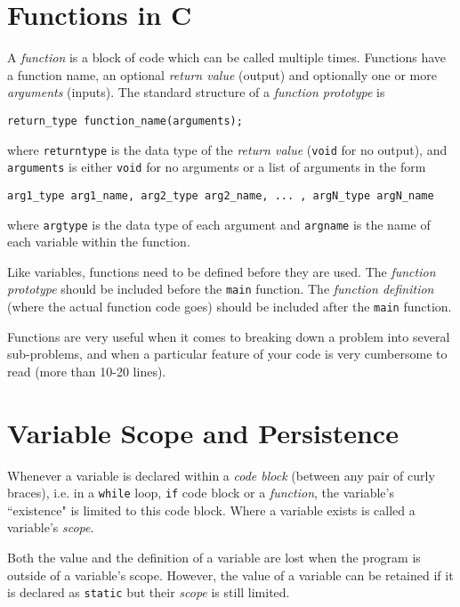 \documentclass{pass}
\begin{document}
\section*{Functions in C}
A \textit{function} is a block of code which can be called multiple times. Functions have a function name, an optional \textit{return value} (output) and optionally one or more \textit{arguments} (inputs). The standard structure of a \textit{function prototype} is
\begin{lstlisting}[style=CStyle]
	return_type function_name(arguments);
\end{lstlisting}
where \texttt{return\textunderscore type} is the data type of the \textit{return value} (\texttt{void} for no output), and  \texttt{arguments} is either \texttt{void} for no arguments or a list of arguments in the form 
\begin{lstlisting}[style=CStyle]
	arg1_type arg1_name, arg2_type arg2_name, ... , argN_type argN_name
\end{lstlisting}
where \texttt{arg\textunderscore type} is the data type of each argument and \texttt{arg\textunderscore name} is the name of each variable within the function.

Like variables, functions need to be defined before they are used. The \textit{function prototype} should be included before the \texttt{main} function. The \textit{function definition} (where the actual function code goes) should be included after the \texttt{main} function.

Functions are very useful when it comes to breaking down a problem into several sub-problems, and when a particular feature of your code is very cumbersome to read (more than 10-20 lines).

\section*{Variable Scope and Persistence}
Whenever a variable is declared within a \textit{code block} (between any pair of curly braces), i.e. in a \texttt{while} loop, \texttt{if} code block or a \textit{function}, the variable's ``existence" is limited to this code block. Where a variable exists is called a variable's \textit{scope}. 

Both the value and the definition of a variable are lost when the program is outside of a variable's scope. However, the value of a variable can be retained if it is declared as \texttt{static} but their \textit{scope} is still limited.
\end{document}
